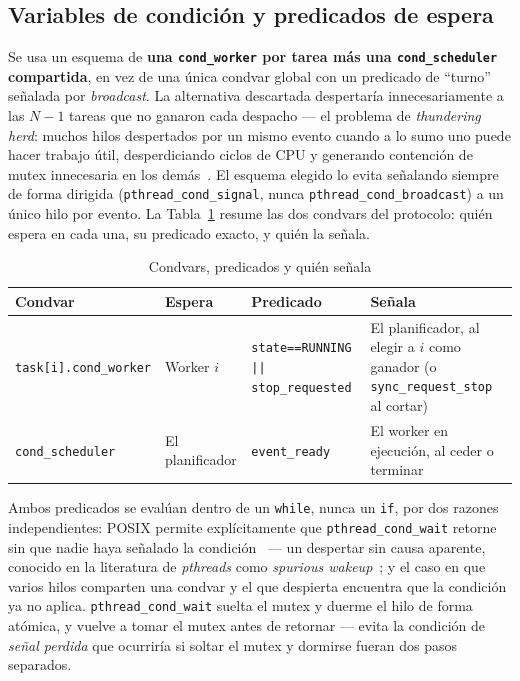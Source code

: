 \subsection{Variables de condición y predicados de espera}

Se usa un esquema de \textbf{una \texttt{cond\_worker} por tarea más una
\texttt{cond\_scheduler} compartida}, en vez de una única condvar global con
un predicado de ``turno'' señalada por \textit{broadcast}. La alternativa
descartada despertaría innecesariamente a las $N-1$ tareas que no ganaron
cada despacho --- el problema de \textit{thundering herd}: muchos hilos
despertados por un mismo evento cuando a lo sumo uno puede hacer trabajo
útil, desperdiciando ciclos de CPU y generando contención de mutex
innecesaria en los demás~\cite{MolloyLever2000}. El esquema elegido lo
evita señalando siempre de forma dirigida
(\texttt{pthread\_cond\_signal}, nunca \texttt{pthread\_cond\_broadcast}) a
un único hilo por evento. La Tabla~\ref{tab:condvars} resume las dos
condvars del protocolo: quién espera en cada una, su predicado exacto, y
quién la señala.

\begin{table}[htbp]
\caption{Condvars, predicados y quién señala}
\label{tab:condvars}
\centering
\renewcommand{\arraystretch}{1.4}
\begin{tabular}{p{3.0cm}p{2.6cm}p{4.5cm}p{7.0cm}}
\toprule
\textbf{Condvar} & \textbf{Espera} & \textbf{Predicado} & \textbf{Señala} \\
\midrule
\texttt{task[i].cond\_worker} &
  Worker $i$ &
  \texttt{state==RUNNING || stop\_requested} &
  El planificador, al elegir a $i$ como ganador (o \texttt{sync\_request\_stop} al cortar) \\
\midrule
\texttt{cond\_scheduler} &
  El planificador &
  \texttt{event\_ready} &
  El worker en ejecución, al ceder o terminar \\
\bottomrule
\end{tabular}
\end{table}

Ambos predicados se evalúan dentro de un \texttt{while}, nunca un
\texttt{if}, por dos razones independientes: POSIX permite explícitamente
que \texttt{pthread\_cond\_wait} retorne sin que nadie haya señalado la
condición~\cite{IEEE1003.1-2024} --- un despertar sin causa aparente,
conocido en la literatura de \textit{pthreads} como \textit{spurious
wakeup}~\cite{Butenhof1997}; y el caso en que varios hilos comparten una
condvar y el que despierta encuentra que la condición ya no aplica. \texttt{pthread\_cond\_wait} suelta el mutex y duerme el hilo de
forma atómica, y vuelve a tomar el mutex antes de retornar --- evita la
condición de \textit{señal perdida} que ocurriría si soltar el mutex y
dormirse fueran dos pasos separados.

